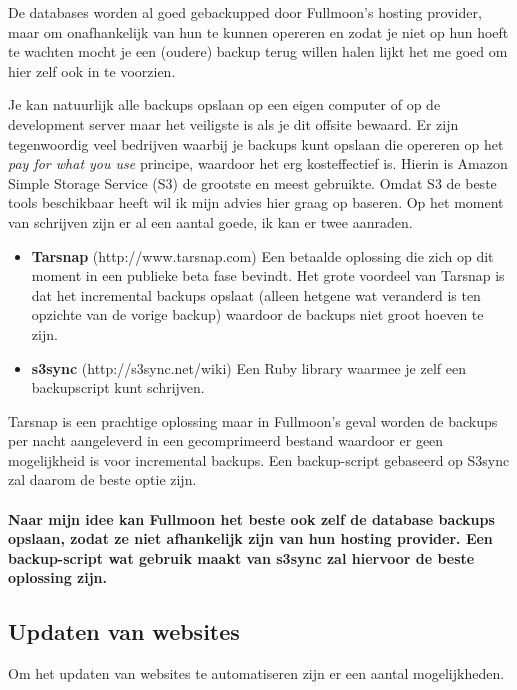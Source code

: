 \documentclass[12pt,a4paper]{article}
\begin{document}
    De databases worden al goed gebackupped door Fullmoon's hosting provider, maar om onafhankelijk van hun te kunnen opereren en zodat je niet op hun hoeft te wachten mocht je een (oudere) backup terug willen halen lijkt het me goed om hier zelf ook in te voorzien.
    
    Je kan natuurlijk alle backups opslaan op een eigen computer of op de development server maar het veiligste is als je dit offsite bewaard. Er zijn tegenwoordig veel bedrijven waarbij je backups kunt opslaan die opereren op het \emph{pay for what you use} principe, waardoor het erg kosteffectief is. Hierin is Amazon Simple Storage Service (S3) de grootste en meest gebruikte. Omdat S3 de beste tools beschikbaar heeft wil ik mijn advies hier graag op baseren. Op het moment van schrijven zijn er al een aantal goede, ik kan er twee aanraden.
        
    \begin{itemize}
      \item \textbf{Tarsnap} (http://www.tarsnap.com) Een betaalde oplossing die zich op dit moment in een publieke beta fase bevindt. Het grote voordeel van Tarsnap is dat het incremental backups opslaat (alleen hetgene wat veranderd is ten opzichte van de vorige backup) waardoor de backups niet groot hoeven te zijn.
      \item \textbf{s3sync} (http://s3sync.net/wiki) Een Ruby library waarmee je zelf een backupscript kunt schrijven.
    \end{itemize}
    
    Tarsnap is een prachtige oplossing maar in Fullmoon's geval worden de backups per nacht aangeleverd in een gecomprimeerd bestand waardoor er geen mogelijkheid is voor incremental backups. Een backup-script gebaseerd op S3sync zal daarom de beste optie zijn.
    
    \paragraph{Naar mijn idee kan Fullmoon het beste ook zelf de database backups opslaan, zodat ze niet afhankelijk zijn van hun hosting provider. Een backup-script wat gebruik maakt van s3sync zal hiervoor de beste oplossing zijn.}
    
    \subsection{Updaten van websites}
  
    Om het updaten van websites te automatiseren zijn er een aantal mogelijkheden. 
    
\end{document}

